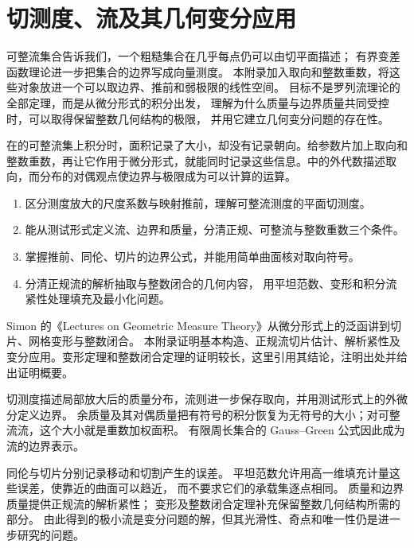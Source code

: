 \chapter{切测度、流及其几何变分应用}
\label{b1:app:D}

\begin{chapterabstract}
可整流集合告诉我们，一个粗糙集合在几乎每点仍可以由切平面描述；
有界变差函数理论进一步把集合的边界写成向量测度。
本附录加入取向和整数重数，将这些对象放进一个可以取边界、推前和弱极限的线性空间。
目标不是罗列流理论的全部定理，而是从微分形式的积分出发，
理解为什么质量与边界质量共同受控时，可以取得保留整数几何结构的极限，
并用它建立几何变分问题的存在性。
\end{chapterabstract}

在的可整流集上积分时，面积记录了大小，却没有记录朝向。给参数片加上取向和整数重数，再让它作用于微分形式，就能同时记录这些信息。中的外代数描述取向，而分布的对偶观点使边界与极限成为可以计算的运算。

\begin{learninggoals}
\begin{enumerate}
 \item\label{b1:item:app-d-goal-tangents}
 区分测度放大的尺度系数与映射推前，理解可整流测度的平面切测度。
 \item\label{b1:item:app-d-goal-objects}
 能从测试形式定义流、边界和质量，分清正规、可整流与整数重数三个条件。
 \item\label{b1:item:app-d-goal-operations}
 掌握推前、同伦、切片的边界公式，并能用简单曲面核对取向符号。
 \item\label{b1:item:app-d-goal-compactness}
 分清正规流的解析抽取与整数闭合的几何内容，
 用平坦范数、变形和积分流紧性处理填充及最小化问题。
\end{enumerate}
\end{learninggoals}

Simon 的《Lectures on Geometric Measure Theory》\cite[\S\S26--32]{Simon1983Lectures}从微分形式上的泛函讲到切片、网格变形与整数闭合。
本附录证明基本构造、正规流切片估计、解析紧性及变分应用。变形定理和整数闭合定理的证明较长，这里引用其结论，注明出处并给出证明概要。








\begin{chaptersummary}
切测度描述局部放大后的质量分布，流则进一步保存取向，并用测试形式上的外微分定义边界。
余质量及其对偶质量把有符号的积分恢复为无符号的大小；对可整流流，这个大小就是重数加权面积。
有限周长集合的 Gauss--Green 公式因此成为流的边界表示。

\ProseParagraphBreak

同伦与切片分别记录移动和切割产生的误差。
平坦范数允许用高一维填充计量这些误差，使靠近的曲面可以趋近，
而不要求它们的承载集逐点相同。
质量和边界质量提供正规流的解析紧性；
变形及整数闭合定理补充保留整数几何结构所需的部分。
由此得到的极小流是变分问题的解，但其光滑性、奇点和唯一性仍是进一步研究的问题。
\end{chaptersummary}

